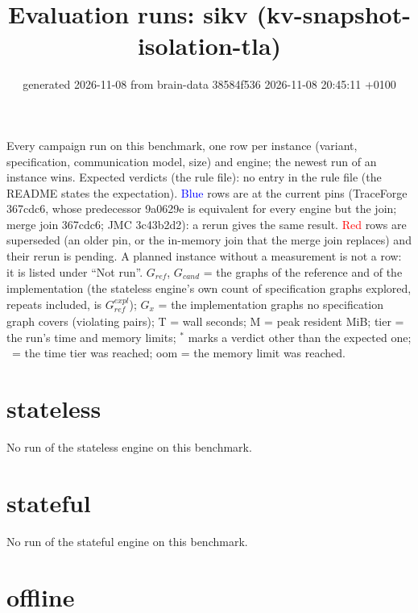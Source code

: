 \documentclass[10pt]{article}
\title{Evaluation runs: \textsf{sikv} (kv-snapshot-isolation-tla)}
\author{}
\date{generated 2026-11-08 from brain-data 38584f536 2026-11-08 20:45:11 +0100}
\begin{document}
\maketitle\small
\noindent Every campaign run on this benchmark, one row per instance (variant, specification, communication model, size) and engine; the newest run of an instance wins. Expected verdicts (the rule file): no entry in the rule file (the README states the expectation). \textcolor{blue}{Blue} rows are at the current pins (TraceForge 367cdc6, whose predecessor 9a0629e is equivalent for every engine but the join; merge join 367cdc6; JMC 3c43b2d2): a rerun gives the same result. \textcolor{red}{Red} rows are superseded (an older pin, or the in-memory join that the merge join replaces) and their rerun is pending. A planned instance without a measurement is not a row: it is listed under ``Not run''. $G_{\mathit{ref}}$, $G_{\mathit{cand}}$ = the graphs of the reference and of the implementation (the stateless engine's own count of specification graphs explored, repeats included, is $G_{\mathit{ref}}^{\mathit{expl}}$); $G_x$ = the implementation graphs no specification graph covers (violating pairs); T = wall seconds; M = peak resident MiB; tier = the run's time and memory limits; $^{\ast}$ marks a verdict other than the expected one; \faClock\ = the time tier was reached; oom = the memory limit was reached.

\section*{stateless}\noindent No run of the stateless engine on this benchmark.
\section*{stateful}\noindent No run of the stateful engine on this benchmark.
\section*{offline}
\end{document}
